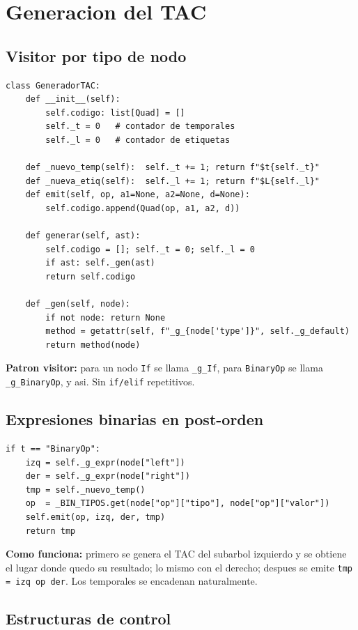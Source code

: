 \documentclass[11pt,a4paper]{article}
\begin{document}
\section{Generacion del TAC}

\subsection{Visitor por tipo de nodo}

\begin{lstlisting}[style=py]
class GeneradorTAC:
    def __init__(self):
        self.codigo: list[Quad] = []
        self._t = 0   # contador de temporales
        self._l = 0   # contador de etiquetas

    def _nuevo_temp(self):  self._t += 1; return f"$t{self._t}"
    def _nueva_etiq(self):  self._l += 1; return f"$L{self._l}"
    def emit(self, op, a1=None, a2=None, d=None):
        self.codigo.append(Quad(op, a1, a2, d))

    def generar(self, ast):
        self.codigo = []; self._t = 0; self._l = 0
        if ast: self._gen(ast)
        return self.codigo

    def _gen(self, node):
        if not node: return None
        method = getattr(self, f"_g_{node['type']}", self._g_default)
        return method(node)
\end{lstlisting}

\textbf{Patron visitor:} para un nodo \texttt{If} se llama
\texttt{\_g\_If}, para \texttt{BinaryOp} se llama \texttt{\_g\_BinaryOp},
y asi. Sin \texttt{if/elif} repetitivos.

\subsection{Expresiones binarias en post-orden}

\begin{lstlisting}[style=py]
if t == "BinaryOp":
    izq = self._g_expr(node["left"])
    der = self._g_expr(node["right"])
    tmp = self._nuevo_temp()
    op  = _BIN_TIPOS.get(node["op"]["tipo"], node["op"]["valor"])
    self.emit(op, izq, der, tmp)
    return tmp
\end{lstlisting}

\textbf{Como funciona:} primero se genera el TAC del subarbol izquierdo
y se obtiene el lugar donde quedo su resultado; lo mismo con el derecho;
despues se emite \texttt{tmp = izq op der}. Los temporales se encadenan
naturalmente.

\subsection{Estructuras de control}
\end{document}
